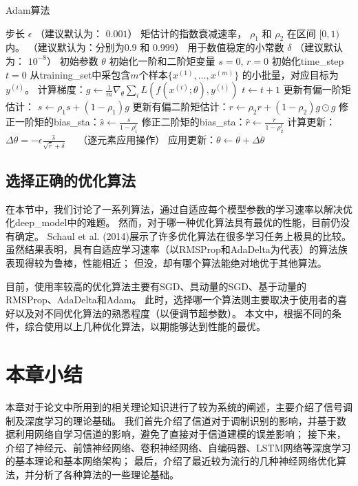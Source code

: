 \begin{algorithm}[ht]
	\caption{Adam算法}
	\label{alg:adam}
	\begin{algorithmic}
		\REQUIRE 步长 $\epsilon$ （建议默认为： $0.001$）
		\REQUIRE 矩估计的指数衰减速率， $\rho_1$ 和 $\rho_2$ 在区间 $[0, 1)$内。
		（建议默认为：分别为$0.9$ 和 $0.999$）
		\REQUIRE 用于数值稳定的小常数 $\delta$  （建议默认为： $10^{-8}$）
		\REQUIRE 初始参数 $\theta$
		\STATE 初始化一阶和二阶矩变量 $s = 0 $, $r = 0$
		\STATE 初始化\gls{time_step} $t=0$ 
		\STATE 从\gls{training_set}中采包含$m$个样本$\{ x^{(1)},\dots, x^{(m)}\}$ 的小批量，对应目标为$y^{(i)}$。
		\STATE 计算梯度：$g \leftarrow \frac{1}{m} \nabla_{\theta} \sum_i L(f(x^{(i)};\theta),y^{(i)})$ 
		\STATE $t \leftarrow t + 1$
		\STATE 更新有偏一阶矩估计： $s \leftarrow \rho_1 s + (1-\rho_1) g$
		\STATE 更新有偏二阶矩估计：$r \leftarrow \rho_2 r + (1-\rho_2)  g \odot g$
		\STATE 修正一阶矩的\gls{bias_sta}：$\hat{s} \leftarrow \frac{s}{1-\rho_1^t}$
		\STATE 修正二阶矩的\gls{bias_sta}：$\hat{r} \leftarrow \frac{r}{1-\rho_2^t}$
		\STATE 计算更新：$\Delta \theta = - \epsilon \frac{\hat{s}}{\sqrt{\hat{r}} + \delta}$ \ \  （逐元素应用操作）
		\STATE 应用更新：$\theta \leftarrow \theta + \Delta \theta$
		\ENDWHILE
	\end{algorithmic}
\end{algorithm}

\subsection{选择正确的优化算法}
\label{sec:choosing_the_right_optimization_algorithms}
在本节中，我们讨论了一系列算法，通过自适应每个模型参数的学习速率以解决优化\gls{deep_model}中的难题。
然而，对于哪一种优化算法具有最优的性能，目前仍没有确定。
Schaul et al. (2014)展示了许多优化算法在很多学习任务上极具的比较。
虽然结果表明，具有自适应学习速率（以RMSProp和AdaDelta为代表）的算法族表现得较为鲁棒，性能相近；
但没，却有哪个算法能绝对地优于其他算法。

目前，使用率较高的优化算法主要有SGD、具动量的SGD、基于动量的RMSProp、AdaDelta和Adam。
此时，选择哪一个算法则主要取决于使用者的喜好以及对不同优化算法的熟悉程度（以便调节超参数）。
本文中，根据不同的条件，综合使用以上几种优化算法，以期能够达到性能的最优。

\section{本章小结}
本章对于论文中所用到的相关理论知识进行了较为系统的阐述，主要介绍了信号调制及深度学习的理论基础。
我们首先介绍了信道对于调制识别的影响，并基于数据利用网络自学习信道的影响，避免了直接对于信道建模的误差影响；
接下来，介绍了神经元、前馈神经网络、卷积神经网络、自编码器、LSTM网络等深度学习的基本理论和基本网络架构；
最后，介绍了最近较为流行的几种神经网络优化算法，并分析了各种算法的一些理论基础。
